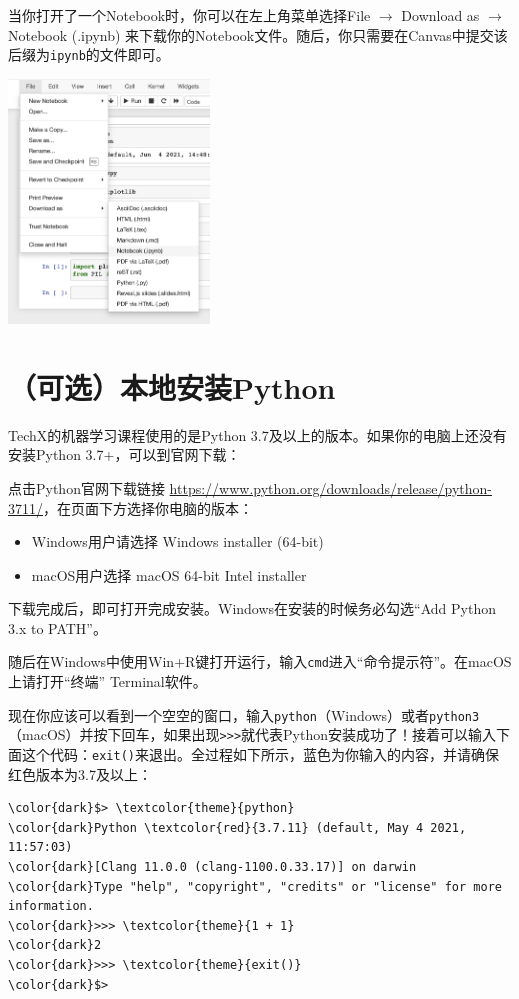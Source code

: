 \documentclass{article}
\begin{document}
  \newpage
  当你打开了一个Notebook时，你可以在左上角菜单选择File $\rightarrow$ Download as $\rightarrow$ Notebook (.ipynb) 来下载你的Notebook文件。随后，你只需要在Canvas中提交该后缀为\texttt{ipynb}的文件即可。
  
  \vspace*{0.3cm}\centerline{\noindent\includegraphics[width=0.4\textwidth]{notebook-download.png}}

\section{（可选）本地安装Python}
TechX的机器学习课程使用的是Python 3.7及以上的版本。如果你的电脑上还没有安装Python 3.7+，可以到官网下载：

点击Python官网下载链接 \url{https://www.python.org/downloads/release/python-3711/}，在页面下方选择你电脑的版本：
\begin{itemize}
\item
Windows用户请选择 Windows installer (64-bit)
\item
macOS用户选择 macOS 64-bit Intel installer
\end{itemize}
下载完成后，即可打开完成安装。Windows在安装的时候务必勾选“Add Python 3.x to PATH”。

随后在Windows中使用Win+R键打开运行，输入\texttt{cmd}进入“命令提示符”。在macOS上请打开“终端” Terminal软件。

现在你应该可以看到一个空空的窗口，输入\texttt{python}（Windows）或者\texttt{python3}（macOS）并按下回车，如果出现\texttt{>>>}就代表Python安装成功了！接着可以输入下面这个代码：\texttt{exit()}来退出。全过程如下所示，蓝色为你输入的内容，并请确保红色版本为3.7及以上：

\begin{Verbatim}[commandchars=\\\{\},xleftmargin=1.5cm]
\color{dark}$> \textcolor{theme}{python}
\color{dark}Python \textcolor{red}{3.7.11} (default, May 4 2021, 11:57:03)
\color{dark}[Clang 11.0.0 (clang-1100.0.33.17)] on darwin
\color{dark}Type "help", "copyright", "credits" or "license" for more information.
\color{dark}>>> \textcolor{theme}{1 + 1}
\color{dark}2
\color{dark}>>> \textcolor{theme}{exit()}
\color{dark}$>
\end{Verbatim}
\end{document}
